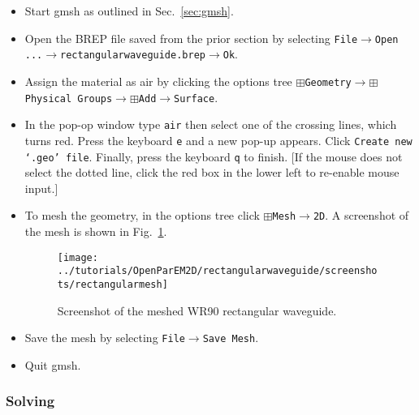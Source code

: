\documentclass[titlepage]{article}
\renewcommand\_{\textunderscore\linebreak[1]}
\begin{document}
\begin{itemize}
\item Start gmsh as outlined in Sec.~\ref{sec:gmsh}.
\item Open the BREP file saved from the prior section by selecting \newline \texttt{File}$\rightarrow$\texttt{Open ...}$\rightarrow$\texttt{rectangular\_waveguide.brep}$\rightarrow$\texttt{Ok}.
\item Assign the material as air by clicking the options tree \newline$\boxplus$\texttt{Geometry}$\rightarrow$$\boxplus$\texttt{Physical Groups}$\rightarrow$$\boxplus$\texttt{Add}$\rightarrow$\texttt{Surface}.
\item In the pop-op window type \texttt{air} then select one of the crossing lines, which turns red.  Press the keyboard \texttt{e} and a new pop-up appears.  Click \texttt{Create new `.geo' file}.  Finally, press the keyboard \texttt{q} to finish.  [If the mouse does not select the dotted line, click the red box in the lower left to re-enable mouse input.]
\item To mesh the geometry, in the options tree click $\boxplus$\texttt{Mesh}$\rightarrow$\texttt{2D}. A screenshot of the mesh is shown in Fig.~\ref{fig:rectangular_mesh}.
\begin{figure}
  \centering
  \texttt{[image: ../tutorials/OpenParEM2D/rectangular\_waveguide/screenshots/rectangular\_mesh]}
  \caption{Screenshot of the meshed WR90 rectangular waveguide.}
  \label{fig:rectangular_mesh}
\end{figure}
\item Save the mesh by selecting \texttt{File}$\rightarrow$\texttt{Save Mesh}.
\item Quit gmsh.
\end{itemize}

\subsubsection{Solving}
\end{document}
